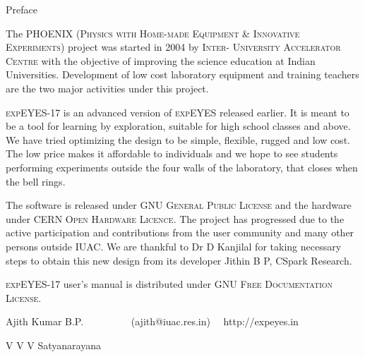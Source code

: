 \documentclass[12pt,a4paper]{report}
\begin{document}
\thispagestyle{empty}

Preface

The PHOENIX (\textsc{Physics with Home-made Equipment \& Innovative
Experiments}) project was started in 2004 by \textsc{Inter- University
Accelerator Centre} with the objective of improving the science
education at Indian Universities. Development of low cost laboratory
equipment and training teachers are the two major activities under
this project.

\textsc{expEYES-17} is an advanced version of \textsc{expEYES}
released earlier. It is meant to be a tool for learning by
exploration, suitable for high school classes and above. We have tried
optimizing the design to be simple, flexible, rugged and low cost.
The low price makes it affordable to individuals and we hope to see
students performing experiments outside the four walls of the
laboratory, that closes when the bell rings.

The software is released under \textsc{GNU General Public License} and
the hardware under \textsc{CERN Open Hardware Licence.} The project
has progressed due to the active participation and contributions from
the user community and many other persons outside \textsc{IUAC}. We
are thankful to Dr D Kanjilal for taking necessary steps to obtain
this new design from its developer Jithin B P, CSpark Research.

\textsc{expEYES-17} user's manual is distributed under \textsc{GNU
Free Documentation License}.



Ajith Kumar B.P. ~~~~~~~~~(ajith@iuac.res.in) ~~http://expeyes.in

V V V Satyanarayana
\end{document}
